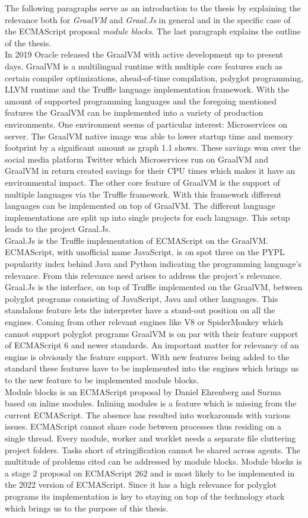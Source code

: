 The following paragraphs serve as an introduction to the thesis by explaining the relevance both for \emph{GraalVM} and \emph{Graal.Js} in general and in the specific case of the ECMAScript proposal \emph{module blocks}. The last paragraph explains the outline of the thesis.\\
In 2019 Oracle released the GraalVM with active development up to present days. GraalVM is a multilingual runtime with multiple core features such as certain compiler optimizations, ahead-of-time compilation, polyglot programming, LLVM runtime and the Truffle language implementation framework. With the amount of supported programming languages and the foregoing mentioned features the GraalVM can be implemented into a variety of production environments. One environment seems of particular interest: Microservices on server. The GraalVM native image was able to lower startup time and memory footprint by a significant amount as graph 1.1 shows. These savings won over the social media platform Twitter which Microservices run on GraalVM and GraalVM in return created savings for their CPU times which makes it have an environmental impact. The other core feature of GraalVM is the support of multiple languages via the Truffle framework. With this framework different languages can be implemented on top of GraalVM. The different language implementations are split up into single projects for each language. This setup leads to the project Graal.Js.\\
Graal.Js is the Truffle implementation of ECMAScript on the GraalVM. ECMAScript, with unofficial name JavaScript, is on spot three on the PYPL popularity index behind Java and Python indicating the programming language's relevance. From this relevance need arises to address the project's relevance. Graal.Js is the interface, on top of Truffle implemented on the GraalVM, between polyglot programs consisting of JavaScript, Java and other languages. This standalone feature lets the interpreter have a stand-out position on all the engines. Coming from other relevant engines like V8 or SpiderMonkey which cannot support polyglot programs GraalVM is on par with their feature support of ECMAScript 6 and newer standards. An important matter for relevancy of an engine is obviously the feature support. With new features being added to the standard these features have to be implemented into the engines which brings us to the new feature to be implemented module blocks.\\
Module blocks is an ECMAScript proposal by Daniel Ehrenberg and Surma based on inline modules. Inlining modules is a feature which is missing from the current ECMAScript. The absence has resulted into workarounds with various issues. ECMAScript cannot share code between processes thus residing on a single thread. Every module, worker and worklet needs a separate file cluttering project folders. Tasks short of stringification cannot be shared across agents. The multitude of problems cited can be addressed by module blocks. Module blocks is a stage 2 proposal on ECMAScript 262 and is most likely to be implemented in the 2022 version of ECMAScript. Since it has a high relevance for polyglot programs its implementation is key to staying on top of the technology stack which brings us to the purpose of this thesis.\\
